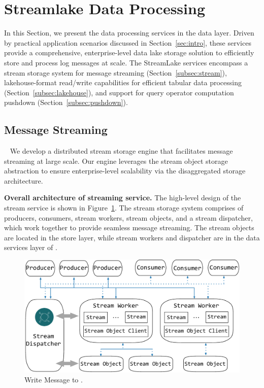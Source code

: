 \section{Streamlake Data Processing} 
\label{sec:dataeva}

In this Section, we present the data processing services  in the data layer. Driven by practical application scenarios discussed in Section~\ref{sec:intro}, these services provide a comprehensive, enterprise-level data lake storage solution  to efficiently store and process  log messages at scale. The StreamLake services encompass a stream storage system for message streaming (Section~\ref{subsec:stream}), lakehouse-format read/write capabilities for efficient tabular data processing (Section~\ref{subsec:lakehouse}),  and support for query operator computation pushdown (Section~\ref{subsec:pushdown}).





\subsection{Message Streaming}~\label{subsec:stream}
We develop a  distributed stream storage engine that facilitates message streaming at large scale. Our engine leverages the stream object storage abstraction to ensure enterprise-level scalability via the disaggregated storage architecture.


\noindent\textbf{Overall architecture of streaming service.} The high-level design of the stream service is shown in Figure~\ref{fig:service}.
 The stream storage system comprises of producers, consumers, stream workers, stream objects, and a stream dispatcher, which work together to provide seamless message streaming. The stream objects are located in the store layer, while stream workers and dispatcher are in the data services layer of \sys.


\begin{figure}[htbp]
	
	\includegraphics[scale=0.36]{figures/streamservice}
	\centering
	\vspace{-1em}
	\caption{Write Message to \sys.}
	\label{fig:service}
	\vspace{-1em}
\end{figure}

